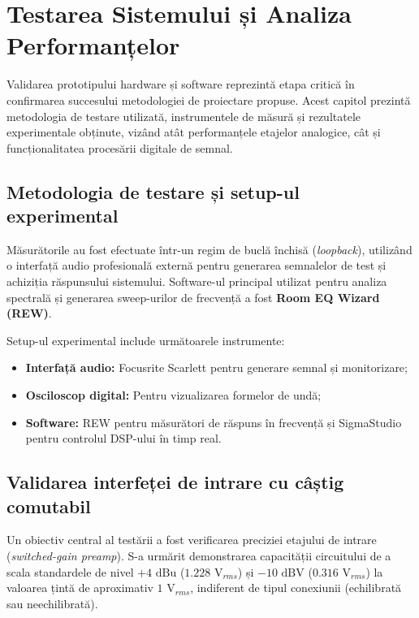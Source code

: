 \chapter{Testarea Sistemului și Analiza Performanțelor \label{testare}}

Validarea prototipului hardware și software reprezintă etapa critică în confirmarea succesului metodologiei de proiectare propuse. Acest capitol prezintă metodologia de testare utilizată, instrumentele de măsură și rezultatele experimentale obținute, vizând atât performanțele etajelor analogice, cât și funcționalitatea procesării digitale de semnal.

\section{Metodologia de testare și setup-ul experimental}

Măsurătorile au fost efectuate într-un regim de buclă închisă (\textit{loopback}), utilizând o interfață audio profesională externă pentru generarea semnalelor de test și achiziția răspunsului sistemului. Software-ul principal utilizat pentru analiza spectrală și generarea sweep-urilor de frecvență a fost \textbf{Room EQ Wizard (REW)}.

Setup-ul experimental include următoarele instrumente:
\begin{itemize}
    \item \textbf{Interfață audio:} Focusrite Scarlett pentru generare semnal și monitorizare;
    \item \textbf{Osciloscop digital:} Pentru vizualizarea formelor de undă;
    \item \textbf{Software:} REW pentru măsurători de răspuns în frecvență și SigmaStudio pentru controlul DSP-ului în timp real.
\end{itemize}

\section{Validarea interfeței de intrare cu câștig comutabil}

Un obiectiv central al testării a fost verificarea preciziei etajului de intrare (\textit{switched-gain preamp}). S-a urmărit demonstrarea capacității circuitului de a scala standardele de nivel $+4\text{ dBu}$ ($1.228\text{ V}_{rms}$) și $-10\text{ dBV}$ ($0.316\text{ V}_{rms}$) la valoarea țintă de aproximativ $1\text{ V}_{rms}$, indiferent de tipul conexiunii (echilibrată sau neechilibrată).

